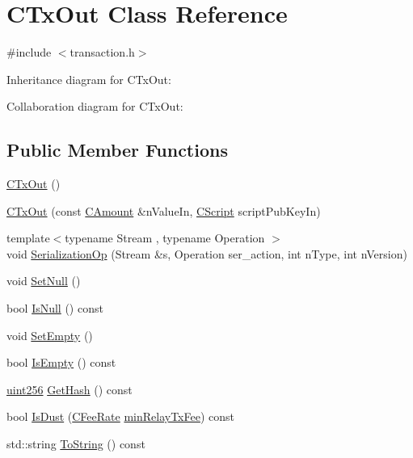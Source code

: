 \hypertarget{class_c_tx_out}{}\section{C\+Tx\+Out Class Reference}
\label{class_c_tx_out}


{\ttfamily \#include $<$transaction.\+h$>$}



Inheritance diagram for C\+Tx\+Out\+:


Collaboration diagram for C\+Tx\+Out\+:
\subsection*{Public Member Functions}
\begin{DoxyCompactItemize}
\item 
\hyperlink{class_c_tx_out_a46110a759b21c75968297768f759be59}{C\+Tx\+Out} ()
\item 
\hyperlink{class_c_tx_out_adc5daeba4e26f1807cee8ec3cc138ef8}{C\+Tx\+Out} (const \hyperlink{amount_8h_a4eaf3a5239714d8c45b851527f7cb564}{C\+Amount} \&n\+Value\+In, \hyperlink{class_c_script}{C\+Script} script\+Pub\+Key\+In)
\item 
{\footnotesize template$<$typename Stream , typename Operation $>$ }\\void \hyperlink{class_c_tx_out_a88e5e2f069325d6bb1936ee75935f121}{Serialization\+Op} (Stream \&s, Operation ser\+\_\+action, int n\+Type, int n\+Version)
\item 
void \hyperlink{class_c_tx_out_a9fe5e6a1be651f130d3dc84a64e78a24}{Set\+Null} ()
\item 
bool \hyperlink{class_c_tx_out_aeaa6b16e0c4caee54196cf8eb0f127f3}{Is\+Null} () const 
\item 
void \hyperlink{class_c_tx_out_aef15a8068187af08b25a7ddfbf8d7744}{Set\+Empty} ()
\item 
bool \hyperlink{class_c_tx_out_ad755fbfcb5c816e21533cc062fcf6ee8}{Is\+Empty} () const 
\item 
\hyperlink{classuint256}{uint256} \hyperlink{class_c_tx_out_afae2ca52efebb049e3af78edc8332e8d}{Get\+Hash} () const 
\item 
bool \hyperlink{class_c_tx_out_aebf080be8a28855321e3581dfe3abcaf}{Is\+Dust} (\hyperlink{class_c_fee_rate}{C\+Fee\+Rate} \hyperlink{main_8h_a5925a10baeee7d4bdce1982bdcbd3bd0}{min\+Relay\+Tx\+Fee}) const 
\item 
std\+::string \hyperlink{class_c_tx_out_aee479c0d4a3786c44e2bc4c35d93b105}{To\+String} () const 
\end{DoxyCompactItemize}
